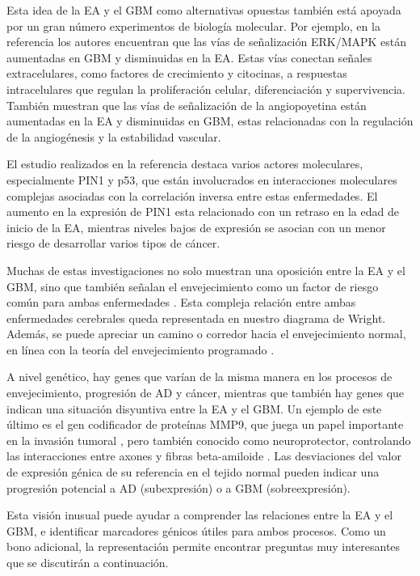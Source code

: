 Esta idea de la EA y el GBM como alternativas opuestas también está apoyada por un gran número experimentos de biología molecular. Por ejemplo, en la referencia \cite{Liu_2013} los autores encuentran que las vías de señalización ERK/MAPK están aumentadas en GBM y disminuidas en la EA. Estas vías conectan señales extracelulares, como factores de crecimiento y citocinas, a respuestas intracelulares que regulan la proliferación celular, diferenciación y supervivencia. También muestran que las vías de señalización de la angiopoyetina están aumentadas en la EA y disminuidas en GBM, estas relacionadas con la regulación de la angiogénesis y la estabilidad vascular.

El estudio realizados en la referencia \cite{Lanni_2020} destaca varios actores moleculares, especialmente PIN1 y p53, que están involucrados en interacciones moleculares complejas asociadas con la correlación inversa entre estas enfermedades. El aumento en la expresión de PIN1 esta relacionado con un retraso en la edad de inicio de la EA, mientras niveles bajos de expresión se asocian con un menor riesgo de desarrollar varios tipos de cáncer.

Muchas de estas investigaciones no solo muestran una oposición entre la EA y el GBM, sino que también señalan el envejecimiento como un factor de riesgo común para ambas enfermedades \cite{Driver_2012, Musicco_2013 , Liu_2013, Lanni_2020, A_Driver_2010}. Esta compleja relación entre ambas enfermedades cerebrales queda representada en nuestro diagrama de Wright. Además, se puede apreciar un camino o corredor hacia el envejecimiento normal, en línea con la teoría del envejecimiento programado \cite{Magalh_es_2012, 	Gems_2022}.

A nivel genético, hay genes que varían de la misma manera en los procesos de envejecimiento, progresión de AD y cáncer, mientras que también hay genes que indican una situación disyuntiva entre la EA y el GBM. Un ejemplo de este último es el gen codificador de proteínas MMP9, que juega un papel importante en la invasión tumoral \cite{Choe2002, Xue_2017}, pero también conocido como neuroprotector, controlando las interacciones entre axones y fibras beta-amiloide \cite{Kaminari_2017}. Las desviaciones del valor de expresión génica de su referencia en el tejido normal pueden indicar una progresión potencial a AD (subexpresión) o a GBM (sobreexpresión).

Esta visión inusual puede ayudar a comprender las relaciones entre la EA y el GBM, e identificar marcadores génicos útiles para ambos procesos. Como un bono adicional, la representación permite encontrar preguntas muy interesantes que se discutirán a continuación.


